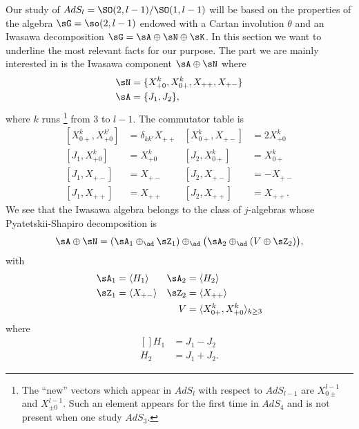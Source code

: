 Our study of $AdS_l=\SO(2,l-1)/\SO(1,l-1)$ will be based on the properties of the algebra $\sG=\so(2,l-1)$ endowed with a Cartan involution $\theta$ and an Iwasawa decomposition $\sG=\sA\oplus\sN\oplus\sK$. In this section we want to underline the most relevant facts for our purpose. The part we are mainly interested in is the Iwasawa component $\sA\oplus\sN$ where
\begin{subequations}		\label{LONGEqLeANEnDimAlg}
\begin{align}
	\sN&=\{ X^{k}_{+0},X^{k}_{0+},X_{++},X_{+-} \}\\
	\sA&=\{ J_1, J_2\},
\end{align}
\end{subequations}
where $k$ runs %
\footnote{The ``new'' vectors which appear in $AdS_l$ with respect to $AdS_{l-1}$ are $X_{0\pm}^{l-1}$ and $X_{\pm 0}^{l-1}$. Such an element appears for the first time in $AdS_4$ and is not present when one study $AdS_3$.} %
from $3$ to $l-1$. The commutator table is
\begin{subequations}  \label{LONGEqTableSOIwa}
	\begin{align}
		[X_{0+}^{k},X_{+0}^{k'}]&=\delta_{kk'}X_{++}		&[X_{0+}^{k},X_{+-}]&=2X_{+0}^{k}\\
		[ J_1,X_{+0}^{k}]&=X_{+0}^{k}				&[ J_2,X_{0+}^{k}]&=X_{0+}^{k}\\
		[ J_1,X_{+-}]&=X_{+-}					&[ J_2,X_{+-}]&=-X_{+-}\\
		[ J_1,X_{++}]&=X_{++}					&[ J_2,X_{++}]&=X_{++}.
	\end{align}
\end{subequations}
We see that the Iwasawa algebra belongs to the class of $j$-algebras whose Pyatetskii-Shapiro decomposition is
\begin{equation}
	\sA\oplus\sN=(\sA_1\oplus_{\ad}\sZ_1)\oplus_{\ad}\big( \sA_2\oplus_{\ad}(V\oplus \sZ_2) \big),
\end{equation}
with
\begin{subequations}
	\begin{align}
		\sA_1&=\langle H_1\rangle		&\sA_2&=\langle H_2\rangle\\
		\sZ_1&=\langle X_{+-}\rangle		&\sZ_2&=\langle X_{++}\rangle\\
		&					&V&=\langle X_{0+}^{k},X_{+0}^{k}\rangle_{k\geq 3}
	\end{align}
\end{subequations}
where
\begin{equation}
	\begin{aligned}[]
		H_1&=J_1-J_2\\
		H_2&=J_1+J_2.
	\end{aligned}
\end{equation}

